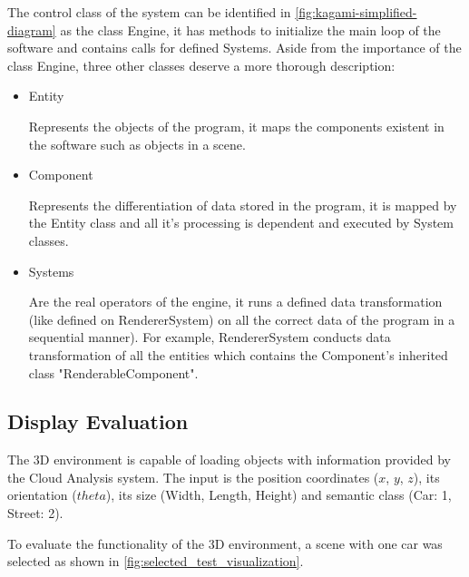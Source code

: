     The control class of the system can be identified in \autoref{fig:kagami-simplified-diagram} as the class Engine, it has methods to initialize the main loop of the software and contains calls for defined Systems. Aside from the importance of the class Engine, three other classes deserve a more thorough description:
    
    \begin{itemize}
        \item Entity
        
        Represents the objects of the program, it maps the components existent in the software such as objects in a scene.
        
        \item Component
        
        Represents the differentiation of data stored in the program, it is mapped by the Entity class and all it's processing is dependent and executed by System classes. 
        
        \item Systems
        
        Are the real operators of the engine, it runs a defined data transformation (like defined on RendererSystem) on all the correct data of the program in a sequential manner). For example, RendererSystem conducts data transformation of all the entities which contains the Component's inherited class "RenderableComponent".
        
    \end{itemize}

\subsection{Display Evaluation}

    The 3D environment is capable of loading objects with information provided by the Cloud Analysis system. The input is the position coordinates (\(x\), \(y\), \(z\)), its orientation (\(theta\)), its size (Width, Length, Height) and semantic class (Car: 1, Street: 2).

    To evaluate the functionality of the 3D environment, a scene with one car was selected as shown in \autoref{fig:selected_test_visualization}. 
    
